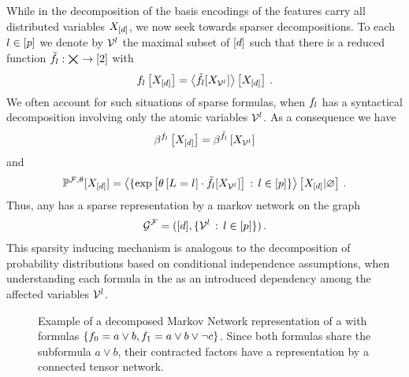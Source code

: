 While in the decomposition of  the basis encodings of the features carry all distributed variables $X_{[d]}$, we now seek towards sparser decompositions.
To each $l\in[p]$ we denote by $\mathcal{V}^{l}$ the maximal subset of $[d]$ such that there is a reduced function
$\tilde{f}_{l} : \bigtimes_{} \rightarrow [2]$
with
\begin{align*}
    f_{l}\left[X_{[d]}\right]
    = \left\langle \tilde{f}_{l}[X_{\mathcal{V}^{l}}]\right\rangle \left[ X_{[d]} \right] \, .
\end{align*}
We often account for such situations of sparse formulas, when $f_{l}$ has a syntactical decomposition involving only the atomic variables $\mathcal{V}^{l}$.
As a consequence we have
\begin{align*}
    \beta^{f_{l}}\left[X_{[d]}\right]
    = \beta^{\tilde{f}_{l}}\left[X_{\mathcal{V}^{l}}\right]
\end{align*}
and
\begin{align*}
    \mathbb{P}^{\mathcal{F},\theta}[X_{[d]}]
    = \left\langle \{\mathrm{exp}\left[\theta\left[L_{}=l_{}\right]\cdot\tilde{f}_{l}[X_{\mathcal{V}^{l}}]\right] \,:\, l\in[p]\}\right\rangle \left[ X_{[d]} | \varnothing \right] \, .
\end{align*}
Thus, any \MarkovLogicNetwork{} has a sparse representation by a markov network on the graph
\begin{align*}
    \mathcal{G}^{\mathcal{F}} = ([d],\{\mathcal{V}^{l} \,:\, l\in[p]\}) \, .
\end{align*}
This sparsity inducing mechanism is analogous to the decomposition of probability distributions based on conditional independence assumptions, when understanding each formula in the \MarkovLogicNetwork{} as an introduced dependency among the affected variables $\mathcal{V}^{l}$.


\begin{figure}[t]
    \begin{center}
        
    \end{center}
    \caption{Example of a decomposed Markov Network representation of a \MarkovLogicNetwork{} with formulas $\{f_{0} = a\lor b, f_{1} = a \lor b \lor \lnot c\}$.
    Since both formulas share the subformula $a\lor b$, their contracted factors have a representation by a connected tensor network.}
    \label{fig:mlnDecRep}
\end{figure}


